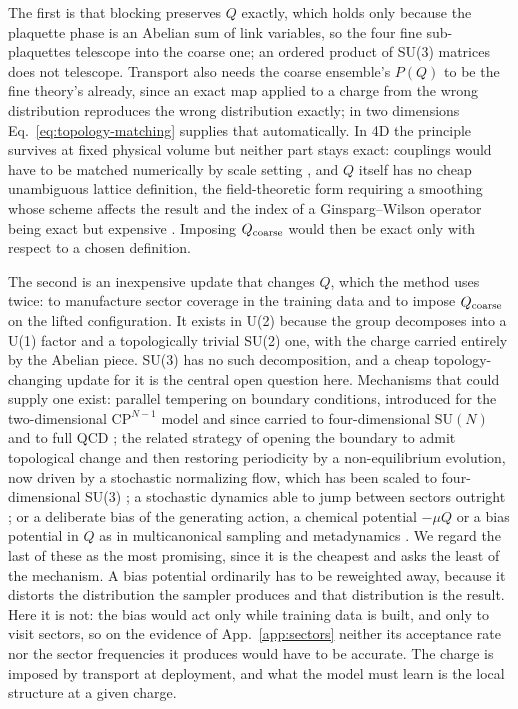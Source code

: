 \documentclass[prd, twocolumn, superscriptaddress, nofootinbib,floatfix]{revtex4-2}
\DeclareRobustCommand{\Eq}[1]{Eq.~\eqref{eq:#1}}
\DeclareRobustCommand{\app}[1]{App.~\ref{app:#1}}
\begin{document}
The first is that blocking preserves $Q$ exactly, which holds only because the
plaquette phase is an Abelian sum of link variables, so the four fine
sub-plaquettes telescope into the coarse one; an ordered product of SU(3)
matrices does not telescope. Transport also needs the coarse ensemble's $P(Q)$
to be the fine theory's already, since an exact map applied to a charge from the
wrong distribution reproduces the wrong distribution exactly; in two dimensions
\Eq{topology-matching} supplies that automatically. In 4D the principle survives
at fixed physical volume but neither part stays exact: couplings would have to
be matched numerically by scale setting \cite{sommer1994,luscher2010}, and $Q$
itself has no cheap unambiguous lattice definition, the field-theoretic form
requiring a smoothing whose scheme affects the result \cite{alexandrou2015} and
the index of a Ginsparg--Wilson operator being exact but expensive
\cite{hasenfratz1998}. Imposing $Q_{\rm coarse}$ would then be
exact only with respect to a chosen definition.

The second is an inexpensive update that changes $Q$, which the method uses
twice: to manufacture sector coverage in the training data and to impose
$Q_{\rm coarse}$ on the lifted configuration. It exists in U(2) because the
group decomposes into a U(1) factor and a topologically trivial SU(2) one, with
the charge carried entirely by the Abelian piece. SU(3) has no such
decomposition, and a cheap topology-changing update for it is the central open
question here. Mechanisms that could supply one exist: parallel tempering on boundary conditions, introduced for the two-dimensional
$\mathrm{CP}^{N-1}$ model \cite{hasenbusch2017} and since carried to
four-dimensional $\mathrm{SU}(N)$ and to full QCD
\cite{bonanno2021,bonanno2024}; the related strategy of opening the boundary to
admit topological change and then restoring periodicity by a non-equilibrium
evolution, now driven by a stochastic normalizing flow, which has been scaled to
four-dimensional SU(3) \cite{bonanno2025su3,bonanno2026}; a stochastic dynamics able to jump
between sectors outright \cite{rothkopf2026}; or a deliberate bias of the
generating action, a chemical potential $-\mu Q$ or a bias potential in $Q$ as in
multicanonical sampling \cite{bergneuhaus1992} and metadynamics
\cite{laio2016,eichhorn2026}. We regard the last of these as the most promising, since it is the cheapest and
asks the least of the mechanism. A bias potential ordinarily has to be
reweighted away, because it distorts the distribution the sampler produces and
that distribution is the result. Here it is not: the bias would act only while
training data is built, and only to visit sectors, so on the evidence of
\app{sectors} neither its acceptance rate nor the sector frequencies it produces
would have to be accurate. The charge is
imposed by transport at deployment, and what the model must learn is the local
structure at a given charge.
\end{document}

